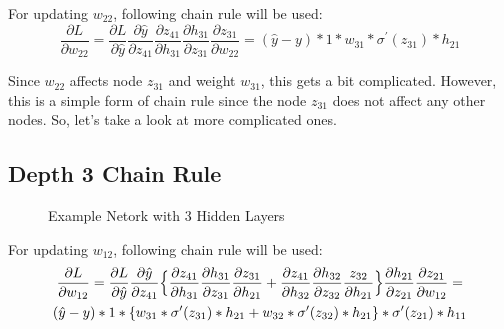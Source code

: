 \documentclass{homework}
\begin{document}
For updating $w_{22}$, following chain rule will be used:
\[
    \frac{\partial L}{\partial w_{22}} = \frac{\partial L}{\partial \hat{y}} \frac{\partial \hat{y}}{\partial z_{41}}\frac{\partial z_{41}}{\partial h_{31}}\frac{\partial h_{31}}{\partial z_{31}}\frac{\partial z_{31}}{\partial w_{22}} = (\hat{y} - y)*1*w_{31}*\sigma^\prime(z_{31})*h_{21} 
\]

Since $w_{22}$ affects node $z_{31}$ and weight $w_{31}$, this gets a bit complicated. However, this is a simple form of chain rule since the node $z_{31}$ does not affect any other nodes. So, let's take a look at more complicated ones.

\subsection{Depth 3 Chain Rule}

\begin{figure}[h]
    \centering
    \caption{Example Netork with 3 Hidden Layers}
    \label{fig:my_label}
\end{figure}
For updating $w_{12}$, following chain rule will be used:
\begin{multline}
    \frac{\partial L}{\partial w_{12}} = \frac{\partial L}{\partial \hat{y}} \frac{\partial \hat{y}}{\partial z_{41}} \Big\{ \frac{\partial z_{41}}{\partial h_{31}} \frac{\partial h_{31}}{\partial z_{31}} \frac{\partial z_{31}}{\partial h_{21}} + \frac{\partial z_{41}}{\partial h_{32}} \frac{\partial h_{32}}{\partial z_{32}} \frac{z_{32}}{\partial h_{21}} \Big\}\frac{\partial h_{21}}{\partial z_{21}} \frac{\partial z_{21}}{\partial w_{12}} = \\ (\hat{y} - y)*1*\{w_{31}*\sigma^\prime(z_{31})*h_{21} + w_{32}*\sigma^\prime(z_{32})*h_{21}\} * \sigma^\prime(z_{21})*h_{11} \notag
\end{multline}
\end{document}
